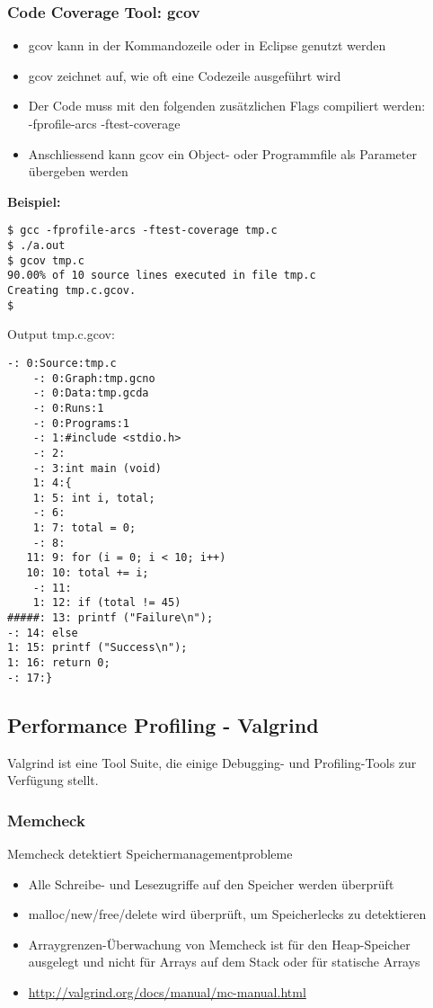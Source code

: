 \subsubsection{Code Coverage Tool: gcov}
\begin{itemize}
    \item gcov kann in der Kommandozeile oder in Eclipse genutzt werden
    \item gcov zeichnet auf, wie oft eine Codezeile ausgeführt wird
    \item Der Code muss mit den folgenden zusätzlichen Flags compiliert werden:\\-fprofile-arcs -ftest-coverage
    \item Anschliessend kann gcov ein Object- oder Programmfile als Parameter übergeben werden
\end{itemize}
\textbf{Beispiel:}
\begin{lstlisting}[style=bash]
$ gcc -fprofile-arcs -ftest-coverage tmp.c
$ ./a.out
$ gcov tmp.c
90.00% of 10 source lines executed in file tmp.c
Creating tmp.c.gcov.
$
\end{lstlisting}
Output tmp.c.gcov:
\begin{lstlisting}[style=bash]
    -: 0:Source:tmp.c
    -: 0:Graph:tmp.gcno
    -: 0:Data:tmp.gcda
    -: 0:Runs:1
    -: 0:Programs:1
    -: 1:#include <stdio.h>
    -: 2:
    -: 3:int main (void)
    1: 4:{
    1: 5: int i, total;
    -: 6:
    1: 7: total = 0;
    -: 8:
   11: 9: for (i = 0; i < 10; i++)
   10: 10: total += i;
    -: 11:
    1: 12: if (total != 45)
#####: 13: printf ("Failure\n");
-: 14: else
1: 15: printf ("Success\n");
1: 16: return 0;
-: 17:}
\end{lstlisting}

\subsection{Performance Profiling - Valgrind}
Valgrind ist eine Tool Suite, die einige Debugging- und Profiling-Tools zur Verfügung stellt.

\subsubsection{Memcheck}
Memcheck detektiert Speichermanagementprobleme
\begin{itemize}
    \item Alle Schreibe- und Lesezugriffe auf den Speicher werden überprüft
    \item malloc/new/free/delete wird überprüft, um Speicherlecks zu detektieren
    \item Arraygrenzen-Überwachung von Memcheck ist für den Heap-Speicher ausgelegt und nicht für Arrays auf dem Stack oder für statische Arrays
    \item \url{http://valgrind.org/docs/manual/mc-manual.html}
\end{itemize}
